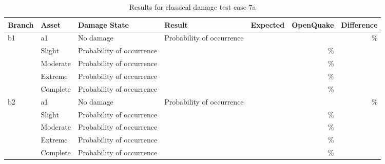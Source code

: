 \begin{table}[htbp]

\centering
\begin{tabular}{ l l l l r r r }

\hline
\rowcolor{anti-flashwhite}
\bf{Branch} & \bf{Asset} & \bf{Damage State} & \bf{Result} & \bf{Expected} & \bf{OpenQuake} & \bf{Difference}\\
\hline
b1 & a1 & No damage & Probability of occurrence &  &  & \% \\
        & Slight    & Probability of occurrence &  &  & \% \\
        & Moderate  & Probability of occurrence &  &  & \% \\
        & Extreme   & Probability of occurrence &  &  & \% \\
        & Complete  & Probability of occurrence &  &  & \% \\
\hline
b2 & a1 & No damage & Probability of occurrence &  &  & \% \\
        & Slight    & Probability of occurrence &  &  & \% \\
        & Moderate  & Probability of occurrence &  &  & \% \\
        & Extreme   & Probability of occurrence &  &  & \% \\
        & Complete  & Probability of occurrence &  &  & \% \\
\hline
\end{tabular}

\caption{Results for classical damage test case 7a}
\label{tab:result-classical-damage-7a}
\end{table}